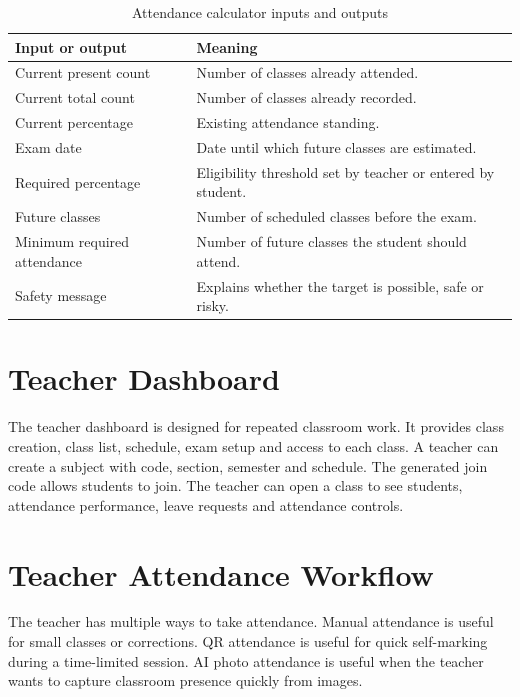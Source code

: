 \begin{table}[H]
\centering
\caption{Attendance calculator inputs and outputs}
\label{tab:calculator}
\begin{tabularx}{\textwidth}{p{3.4cm} X}
\toprule
\textbf{Input or output} & \textbf{Meaning}\\
\midrule
Current present count & Number of classes already attended.\\
Current total count & Number of classes already recorded.\\
Current percentage & Existing attendance standing.\\
Exam date & Date until which future classes are estimated.\\
Required percentage & Eligibility threshold set by teacher or entered by student.\\
Future classes & Number of scheduled classes before the exam.\\
Minimum required attendance & Number of future classes the student should attend.\\
Safety message & Explains whether the target is possible, safe or risky.\\
\bottomrule
\end{tabularx}
\end{table}

\section{Teacher Dashboard}

The teacher dashboard is designed for repeated classroom work. It provides class creation, class list, schedule, exam setup and access to each class. A teacher can create a subject with code, section, semester and schedule. The generated join code allows students to join. The teacher can open a class to see students, attendance performance, leave requests and attendance controls.

\section{Teacher Attendance Workflow}

The teacher has multiple ways to take attendance. Manual attendance is useful for small classes or corrections. QR attendance is useful for quick self-marking during a time-limited session. AI photo attendance is useful when the teacher wants to capture classroom presence quickly from images.

